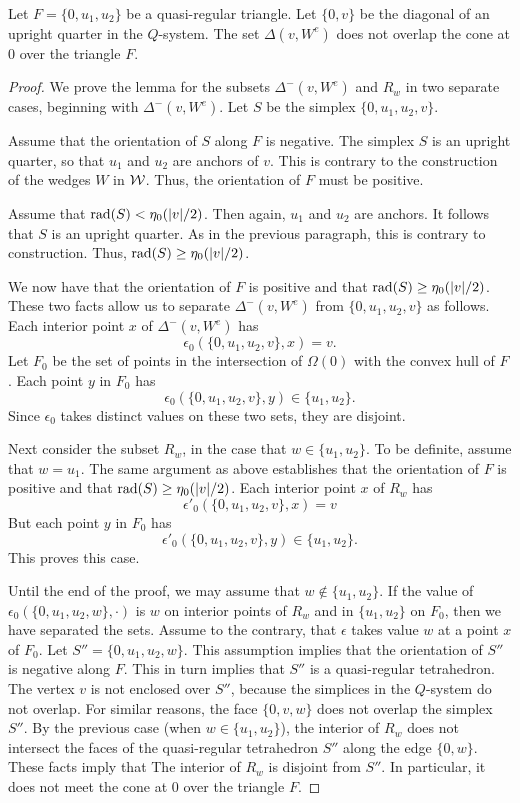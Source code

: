 \begin{lemma}\label{lemma:delta-tri}
Let $F=\{0,u_1,u_2\}$ be a quasi-regular triangle.  Let $\{0,v\}$ be
the diagonal of an upright quarter in the $Q$-system. The set
$\Delta(v,W^e)$ does not overlap the cone at $0$ over the triangle
$F$.
\end{lemma}

\begin{proof}
We prove the lemma for the subsets $\Delta^-(v,W^e)$ and $R_w$ in
two separate cases, beginning with $\Delta^-(v,W^e)$.  Let $S$ be the simplex
$\{0,u_1,u_2,v\}$.

Assume that the orientation of $S$ along $F$ is negative.  The
simplex $S$ is an upright quarter, so that $u_1$ and $u_2$ are
anchors of $v$. This is contrary to the construction of the wedges
$W$ in ${\mathcal W}$. Thus, the orientation of $F$ must be positive.

Assume that $\operatorname{rad}(S)< \eta_0(|v|/2)$.  Then again, $u_1$ and $u_2$
are anchors.  It follows that $S$ is an upright quarter.  As in
the previous paragraph, this is contrary to construction.  Thus,
$\operatorname{rad}(S)\ge \eta_0(|v|/2)$.



We now have that the orientation of $F$ is positive and that $\operatorname{rad}(S)\ge \eta_0(|v|/2)$.
These two facts allow us to separate $\Delta^-(v,W^e)$ from $\{0,u_1,u_2,v\}$ as follows.
Each interior point $x$ of $\Delta^-(v,W^e)$ has
$$\epsilon_0( \{ 0,u_1,u_2,v \} ,x) = v.$$
Let $F_0$ be the set of  points in the intersection of $\Omega(0)$
with the convex hull of $F$.  Each point $y$ in $F_0$ has
$$\epsilon_0( \{ 0,u_1,u_2,v \} ,y) \in \{u_1,u_2\}.$$
Since $\epsilon_0$ takes distinct values on these two sets, they
are disjoint.

Next consider the subset $R_w$, in the case that $w\in\{u_1,u_2\}$.  To be definite,
assume that $w=u_1$.  The same argument as above establishes that
the orientation of $F$ is positive and that $\operatorname{rad}(S) \ge \eta_0(|v|/2)$.
Each interior point $x$ of $R_w$ has
$$\epsilon'_0( \{ 0,u_1,u_2,v \} ,x) = v$$
But each point $y$ in $F_0$ has
$$\epsilon'_0( \{ 0,u_1,u_2,v \} ,y) \in \{u_1,u_2\}.$$
This proves this case.


Until the end of the proof, we may assume that
$w\not\in\{u_1,u_2\}$.  If the value of
$\epsilon_0(\{0,u_1,u_2,w\},\cdot)$ is $w$ on interior points of
$R_w$ and in $\{u_1,u_2\}$ on $F_0$, then we have separated the
sets.  Assume to the contrary, that $\epsilon$ takes value $w$ at
a point $x$ of $F_0$.  Let $S''=\{0,u_1,u_2,w\}$.  This assumption
implies that the orientation of $S''$ is negative along $F$.  This
in turn implies that $S''$ is a quasi-regular tetrahedron.  The
vertex $v$ is not enclosed over $S''$, because the simplices in
the $Q$-system do not overlap.  For similar reasons, the face
$\{0,v,w\}$ does not overlap the simplex $S''$.  By the previous
case (when $w\in\{u_1,u_2\}$), the interior of $R_w$ does not
intersect the faces of the quasi-regular tetrahedron $S''$ along
the edge $\{0,w\}$.  These facts imply that The interior of $R_w$
is disjoint from $S''$.  In particular, it does not meet the cone
at $0$ over the triangle $F$.


\end{proof}
